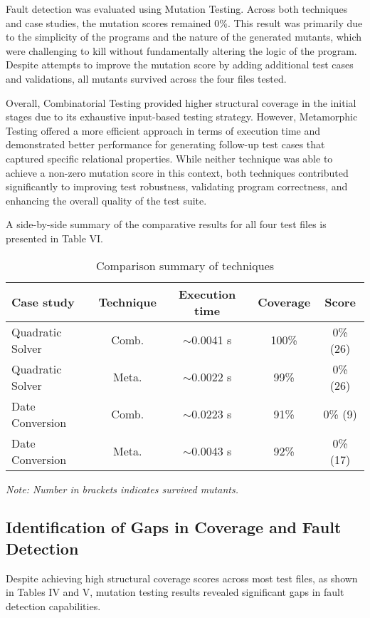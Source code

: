 \documentclass[conference]{IEEEtran}
\begin{document}
Fault detection was evaluated using Mutation Testing. Across both techniques and case studies, the mutation scores remained 0\%. This result was primarily due to the simplicity of the programs and the nature of the generated mutants, which were challenging to kill without fundamentally altering the logic of the program. Despite attempts to improve the mutation score by adding additional test cases and validations, all mutants survived across the four files tested.

Overall, Combinatorial Testing provided higher structural coverage in the initial stages due to its exhaustive input-based testing strategy. However, Metamorphic Testing offered a more efficient approach in terms of execution time and demonstrated better performance for generating follow-up test cases that captured specific relational properties. While neither technique was able to achieve a non-zero mutation score in this context, both techniques contributed significantly to improving test robustness, validating program correctness, and enhancing the overall quality of the test suite.

A side-by-side summary of the comparative results for all four test files is presented in Table VI.

\begin{table}[htbp]
\caption{Comparison summary of techniques}
\centering
\begin{tabular}{|l|c|c|c|c|}
\hline
Case study & Technique & Execution time & Coverage & Score \\
\hline
Quadratic Solver & Comb. & $\sim$0.0041 s & 100\% & 0\% (26) \\
Quadratic Solver & Meta. & $\sim$0.0022 s & 99\%  & 0\% (26) \\
Date Conversion  & Comb. & $\sim$0.0223 s & 91\%  & 0\% (9)  \\
Date Conversion  & Meta. & $\sim$0.0043 s & 92\%  & 0\% (17) \\
\hline
\end{tabular}
\vspace{2mm} %
\textit{Note: Number in brackets indicates survived mutants.}
\end{table}
    
    
\subsection{Identification of Gaps in Coverage and Fault Detection}    
Despite achieving high structural coverage scores across most test files, as shown in Tables IV and V, mutation testing results revealed significant gaps in fault detection capabilities.
\end{document}
